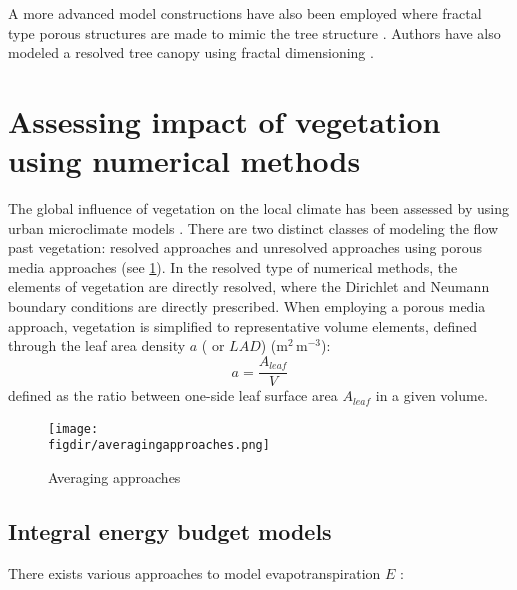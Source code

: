 A more advanced model constructions have also been employed where fractal type porous structures are made to mimic the tree structure \citep{McClure2017}. Authors have also modeled a resolved tree canopy using fractal dimensioning \citep{Bai2012,Bai2014a}. 

\section{Assessing impact of vegetation using numerical methods}

The global influence of vegetation on the local climate has been assessed by using urban microclimate models \citep{Bruse1998, Robitu2006}. There are two distinct classes of modeling the flow past vegetation: resolved approaches \citep{Endalew2009,Endalew2006} and unresolved approaches using porous media approaches \citep{Sanz2003, Kenjeres2013, Gromke2014, Katul2004} (see \cref{fig:averagingapproaches}). In the resolved type of numerical methods, the elements of vegetation are directly resolved, where the Dirichlet and Neumann boundary conditions are directly prescribed. When employing a porous media approach, vegetation is simplified to representative volume elements, defined through the leaf area density $a$ ( or $\textit{LAD}$) (m$^2$\,m$^{-3}$):
\begin{equation}
a = \frac{A_{\textit{leaf}}}{V}
\end{equation}
defined as the ratio between one-side leaf surface area $A_{\textit{leaf}}$ in a given volume. 

	\begin{figure}[h]
		\centering
		\texttt{[image: \\figdir/averagingapproaches.png]}
		\caption{Averaging approaches}
		\label{fig:averagingapproaches}
	\end{figure}	

\subsection{Integral energy budget models}

There exists various approaches to model evapotranspiration $E$ \citep{abtew2012evaporation}: 


